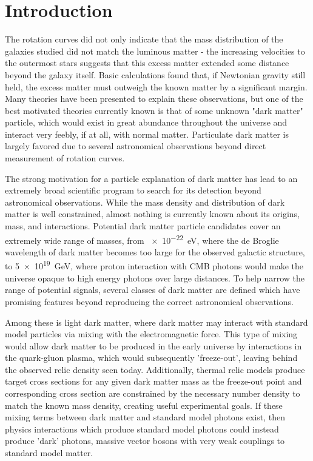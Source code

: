 \chapter{Introduction}
\label{intro_chapter}

The rotation curves did not only indicate that the mass distribution of the galaxies studied did not match the luminous matter - the increasing velocities to the outermost stars suggests that this excess matter extended some distance beyond the galaxy itself. 
Basic calculations found that, if Newtonian gravity still held, the excess matter must outweigh the known matter by a significant margin. 
Many theories have been presented to explain these observations, but one of the best motivated theories currently known is that of some unknown "dark matter" particle, which would exist in great abundance throughout the universe and interact very feebly, if at all, with normal matter.
Particulate dark matter is largely favored due to several astronomical observations beyond direct measurement of rotation curves.

The strong motivation for a particle explanation of dark matter has lead to an extremely broad scientific program to search for its detection beyond astronomical observations. 
While the mass density and distribution of dark matter is well constrained, almost nothing is currently known about its origins, mass, and interactions.
Potential dark matter particle candidates cover an extremely wide range of masses, from \SI{e-22}{\eV}, where the de Broglie wavelength of dark matter becomes too large for the observed galactic structure, to \SI{5e19}{\giga\eV}, where proton interaction with CMB photons would make the universe opaque to high energy photons over large distances.
To help narrow the range of potential signals, several classes of dark matter are defined which have promising features beyond reproducing the correct astronomical observations. 

Among these is light dark matter, where dark matter may interact with standard model particles via mixing with the electromagnetic force. 
This type of mixing would allow dark matter to be produced in the early universe by interactions in the quark-gluon plasma, which would subsequently 'freeze-out', leaving behind the observed relic density seen today. 
Additionally, thermal relic models produce target cross sections for any given dark matter mass as the freeze-out point and corresponding cross section are constrained by the necessary number density to match the known mass density, creating useful experimental goals.
If these mixing terms between dark matter and standard model photons exist, then physics interactions which produce standard model photons could instead produce 'dark' photons, massive vector bosons with very weak couplings to standard model matter.

